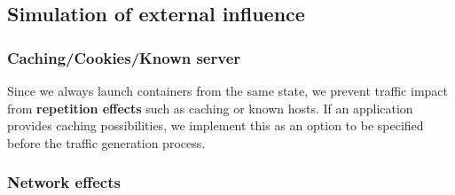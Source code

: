 \documentclass[runningheads]{llncs}
\begin{document}





\subsection{Simulation of external influence}\label{Sec:ExtInfls}

\subsubsection*{Caching/Cookies/Known server}

Since we always launch containers from the same state, we prevent traffic impact from \textbf{repetition effects} such as caching or known hosts. If an application provides caching possibilities, we implement this as an option to be specified before the traffic generation process.


\subsubsection*{Network effects}

\end{document}
